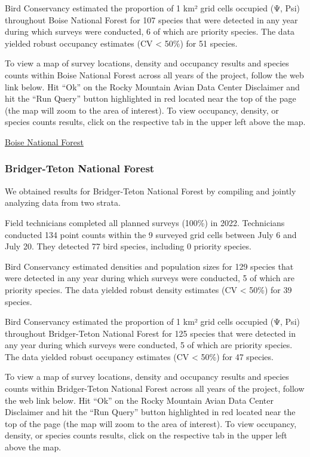 \documentclass[
  letterpaper,
  DIV=11,
  numbers=noendperiod,
  oneside]{scrreprt}
\begin{document}
Bird Conservancy estimated the proportion of 1 km² grid cells occupied
(Ψ, Psi) throughout Boise National Forest for 107 species that were
detected in any year during which surveys were conducted, 6 of which are
priority species. The data yielded robust occupancy estimates (CV
\textless{} 50\%) for 51 species.

To view a map of survey locations, density and occupancy results and
species counts within Boise National Forest across all years of the
project, follow the web link below. Hit ``Ok'' on the Rocky Mountain
Avian Data Center Disclaimer and hit the ``Run Query'' button
highlighted in red located near the top of the page (the map will zoom
to the area of interest). To view occupancy, density, or species counts
results, click on the respective tab in the upper left above the map.

\href{http://www.rmbo.org/new_site/adc/QueryWindow.aspx\#N4IgzgrgDgpgTmALnAhoiBbEAuABCAIQHsBLMGXAOTRKIDsUAbXAMSLhiRAF8g==}{Boise
National Forest}

\hypertarget{bridger-teton-national-forest}{%
\subsubsection{Bridger-Teton National
Forest}\label{bridger-teton-national-forest}}

We obtained results for Bridger-Teton National Forest by compiling and
jointly analyzing data from two strata.

Field technicians completed all planned surveys (100\%) in 2022.
Technicians conducted 134 point counts within the 9 surveyed grid cells
between July 6 and July 20. They detected 77 bird species, including 0
priority species.

Bird Conservancy estimated densities and population sizes for 129
species that were detected in any year during which surveys were
conducted, 5 of which are priority species. The data yielded robust
density estimates (CV \textless{} 50\%) for 39 species.

Bird Conservancy estimated the proportion of 1 km² grid cells occupied
(Ψ, Psi) throughout Bridger-Teton National Forest for 125 species that
were detected in any year during which surveys were conducted, 5 of
which are priority species. The data yielded robust occupancy estimates
(CV \textless{} 50\%) for 47 species.

To view a map of survey locations, density and occupancy results and
species counts within Bridger-Teton National Forest across all years of
the project, follow the web link below. Hit ``Ok'' on the Rocky Mountain
Avian Data Center Disclaimer and hit the ``Run Query'' button
highlighted in red located near the top of the page (the map will zoom
to the area of interest). To view occupancy, density, or species counts
results, click on the respective tab in the upper left above the map.
\end{document}
